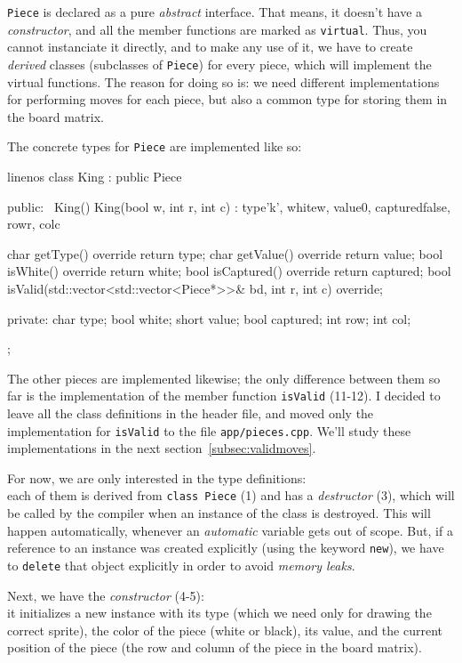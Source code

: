 \texttt{Piece} is declared as a pure \emph{abstract} interface.
That means, it doesn't have a \emph{constructor}, and all the member functions are marked
as \texttt{virtual}.
Thus, you cannot instanciate it directly, and to make any use of it, we have to create
\emph{derived} classes (subclasses of \texttt{Piece}) for every piece, which will
implement the virtual functions.
The reason for doing so is: we need different implementations for performing moves for
each piece, but also a common type for storing them in the board matrix. 

The concrete types for \texttt{Piece} are implemented like so:

\begin{cpp*}{linenos}
class King : public Piece {
public:
  ~King() {}
  King(bool w, int r, int c) : type{'k'}, white{w}, value{0},
                              captured{false}, row{r}, col{c} {}

  char getType() override { return type; }
  char getValue() override { return value; }
  bool isWhite() override { return white; }
  bool isCaptured() override { return captured; }
  bool isValid(std::vector<std::vector<Piece*>>& bd,
               int r, int c) override;

private:
  char type;
  bool white;
  short value;
  bool captured;
  int row;
  int col;
};
\end{cpp*}

The other pieces are implemented likewise; the only difference between them so far is the
implementation of the member function \texttt{isValid} (11-12).
I decided to leave all the class definitions in the header file, and moved only the
implementation for \texttt{isValid} to the file \texttt{app/pieces.cpp}.
We'll study these implementations in the next section~\ref{subsec:validmoves}.

For now, we are only interested in the type definitions:\\
each of them is derived from \texttt{class Piece} (1) and has a \emph{destructor} (3),
which will be called by the compiler when an instance of the class is destroyed.
This will happen automatically, whenever an \emph{automatic} variable gets out of scope.
But, if a reference to an instance was created explicitly (using the keyword \texttt{new}),
we have to \texttt{delete} that object explicitly in order to avoid \emph{memory leaks}.

Next, we have the \emph{constructor} (4-5):\\
it initializes a new instance with its type (which we need only for drawing the correct sprite),
the color of the piece (white or black), its value, and the current position
of the piece (the row and column of the piece in the board matrix).

